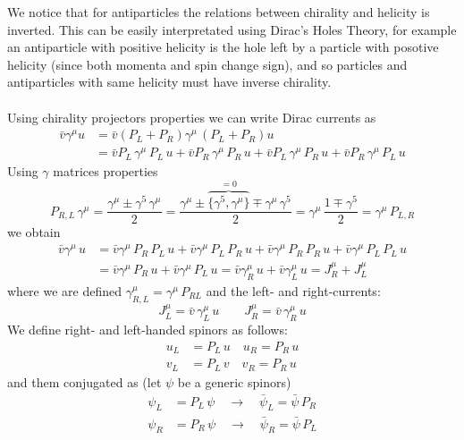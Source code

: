 \documentclass[TheoreticalPhy_ModB.tex]{subfiles}
\begin{document}
We notice that for antiparticles the relations between chirality and helicity is inverted. This can be easily interpretated using Dirac's Holes Theory, for example an antiparticle with positive helicity is the hole left by a particle with posotive helicity (since both momenta and spin change sign), and so particles and antiparticles with same helicity must have inverse chirality.\\ \\
Using chirality projectors properties we can write Dirac currents as
\[
\begin{split}
\bar{v}\gamma^{\mu}u 	& = \bar{v}(P_L + P_R) \gamma^{\mu} \, (P_L +P_R) u \\
					& = \bar{v} P_L \, \gamma^{\mu} \, P_L \, u + \bar{v} P_R \, \gamma^{\mu} \, P_R \, u
					+ \bar{v} P_L \, \gamma^{\mu} \, P_R \, u + \bar{v} P_R \, \gamma^{\mu} \, P_L \, u
\end{split}
\]
Using $\gamma$ matrices properties
\[
P_{R,L} \, \gamma^{\mu} 
	= \frac{\gamma^{\mu} \pm \gamma^5 \, \gamma^{\mu}}{2} 
	= \frac{ \gamma^{\mu} \pm \overbrace{\{ \gamma^5, \gamma^{\mu} \}}^{=0} \mp \gamma^{\mu} \, \gamma^5}{2}
	= \gamma^{\mu} \, \frac{1 \mp \gamma^5}{2} = \gamma^{\mu} \, P_{L, R}
\]
we obtain
\[
\begin{split}
\bar{v}\gamma^{\mu} \, u 
	& = \bar{v} \gamma^{\mu} \, P_R \, P_L \, u + \bar{v} \gamma^{\mu} \, P_L \, P_R \, u
	+ \bar{v} \gamma^{\mu} \, P_R \, P_R \, u + \bar{v} \gamma^{\mu} \, P_L \, P_L \, u \\
	& = \bar{v} \gamma^{\mu} \, P_R \, u + \bar{v} \gamma^{\mu} \, P_L \, u
	= \bar{v} \gamma^{\mu}_R \, u + \bar{v} \gamma^{\mu}_L \, u = J^{\mu}_R + J^{\mu}_L
\end{split}
\]
where we are defined $\gamma^{\mu}_{R, L} = \gamma^{\mu} \, P_{RL}$ and the left- and right-currents:
\[
J_L^{\mu} = \bar{v} \, \gamma^{\mu}_L \, u
\qquad
J_R^{\mu} = \bar{v} \, \gamma_R^{\mu} \, u
\]
We define right- and left-handed spinors as follows:
\begin{align*}
u_L 	& = P_L \, u 	\quad	u_R = P_R \, u \\
v_L 	& = P_L \, v	\quad	v_R = P_R \, u
\end{align*}
and them conjugated as (let $\psi$ be a generic spinors)
\begin{align*}
\psi_L 	& = P_L \, \psi \quad \to \quad \bar{\psi}_L = \bar{\psi} \, P_R \\
\psi_R 	& = P_R \, \psi \quad \to \quad \bar{\psi}_R = \bar{\psi} \, P_L
\end{align*}
\end{document}
